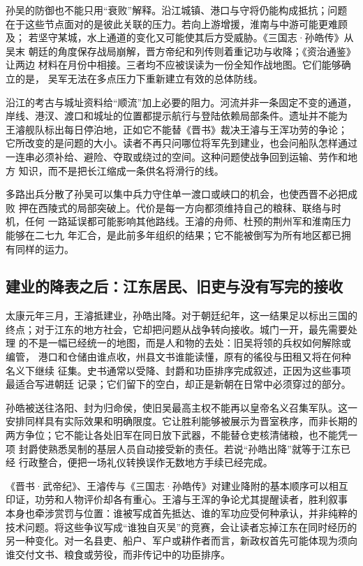 孙吴的防御也不能只用“衰败”解释。沿江城镇、港口与守将仍能构成抵抗；问题
在于这些节点面对的是彼此关联的压力。若向上游增援，淮南与中游可能更难顾及；
若坚守某城，水上通道的变化又可能使其后方受威胁。《三国志·孙皓传》从吴末
朝廷的角度保存战局崩解，晋方帝纪和列传则着重记功与收降；《资治通鉴》让两边
材料在月份中相接。三者均不应被误读为一份全知作战地图。它们能够确立的是，
吴军无法在多点压力下重新建立有效的总体防线。

沿江的考古与城址资料给“顺流”加上必要的阻力。河流并非一条固定不变的通道，
岸线、港汊、渡口和城址的位置都提示航行与登陆依赖局部条件。遗址并不能为
王濬舰队标出每日停泊地，正如它不能替《晋书》裁决王濬与王浑功劳的争论；
它所改变的是问题的大小。读者不再只问哪位将军先到建业，也会问船队怎样通过
一连串必须补给、避险、夺取或绕过的空间。这种问题使战争回到运输、劳作和地方
知识，而不是把长江缩成一条供名将滑行的线。

\begin{turningpoint}
多路出兵分散了孙吴可以集中兵力守住单一渡口或峡口的机会，也使西晋不必把成败
押在西陵式的局部突破上。代价是每一方向都须维持自己的粮秣、联络与时机，任何
一路延误都可能影响其他路线。王濬的舟师、杜预的荆州军和淮南压力能够在二七九
年汇合，是此前多年组织的结果；它不能被倒写为所有地区都已拥有同样的运力。
\end{turningpoint}

\subsection{建业的降表之后：江东居民、旧吏与没有写完的接收}

太康元年三月，王濬抵建业，孙皓出降。对于朝廷纪年，这一结果足以标出三国的
终点；对于江东的地方社会，它却把问题从战争转向接收。城门一开，最先需要处理
的不是一幅已经统一的地图，而是人和物的去处：旧吴将领的兵权如何解除或编管，
港口和仓储由谁点收，州县文书谁能读懂，原有的徭役与田租又将在何种名义下继续
征集。史书通常以受降、封爵和功臣排序完成叙述，正因为这些事项最适合写进朝廷
记录；它们留下的空白，却正是新朝在日常中必须穿过的部分。

孙皓被送往洛阳、封为归命侯，使旧吴最高主权不能再以皇帝名义召集军队。这一
安排同样具有实际效果和明确限度。它让胜利能够被展示为晋室秩序，而非长期的
两方争位；它不能让各处旧军在同日放下武器，不能替仓吏核清储粮，也不能凭一项
封爵使熟悉吴制的基层人员自动接受新的责任。若说“孙皓出降”就等于江东已经
行政整合，便把一场礼仪转换误作无数地方手续已经完成。

《晋书·武帝纪》、王濬传与《三国志·孙皓传》对建业降附的基本顺序可以相互
印证，功劳和人物评价却各有重心。王濬与王浑的争论尤其提醒读者，胜利叙事
本身也牵涉赏罚与位置：谁被写成首先抵达、谁的军功应受何种承认，并非纯粹的
技术问题。将这些争议写成“谁独自灭吴”的竞赛，会让读者忘掉江东在同时经历的
另一种变化。对一名县吏、船户、军户或耕作者而言，新政权首先可能体现为须向
谁交付文书、粮食或劳役，而非传记中的功臣排序。

